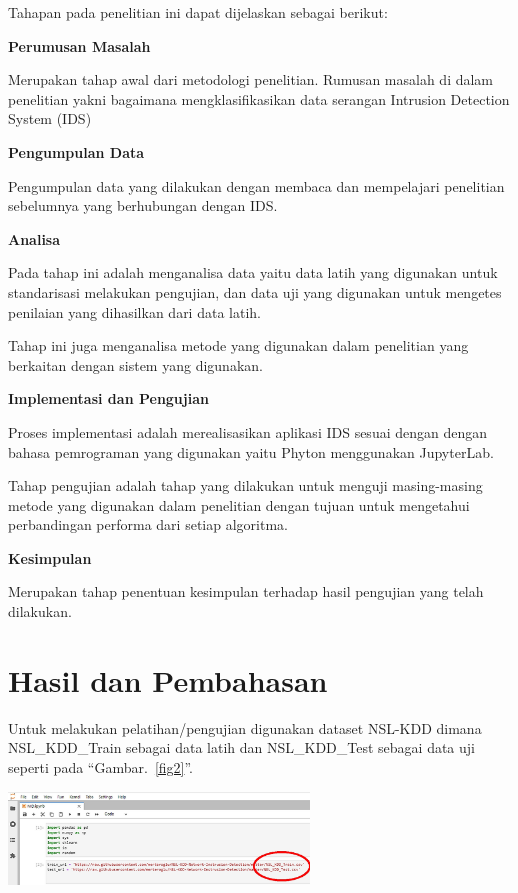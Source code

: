 \documentclass[conference]{IEEEtran}
\begin{document}
Tahapan pada penelitian ini dapat dijelaskan sebagai berikut:

\noindent \textbf{Perumusan Masalah}

Merupakan tahap awal dari metodologi penelitian. Rumusan
masalah di dalam penelitian yakni bagaimana mengklasifikasikan data serangan Intrusion Detection System (IDS)

\noindent \textbf{Pengumpulan Data}

Pengumpulan data yang dilakukan dengan membaca dan mempelajari penelitian sebelumnya yang berhubungan dengan IDS.

\noindent \textbf{Analisa}

Pada tahap ini adalah menganalisa data yaitu data latih yang digunakan untuk standarisasi melakukan pengujian, dan data uji yang digunakan untuk mengetes penilaian yang dihasilkan
dari data latih.

Tahap ini juga menganalisa metode yang digunakan dalam penelitian yang berkaitan dengan sistem yang digunakan.

\noindent \textbf{Implementasi dan Pengujian}

Proses implementasi adalah merealisasikan aplikasi IDS sesuai dengan dengan bahasa pemrograman yang digunakan yaitu Phyton menggunakan JupyterLab.

Tahap pengujian adalah tahap yang dilakukan untuk menguji masing-masing metode yang digunakan dalam penelitian dengan tujuan untuk mengetahui perbandingan performa dari setiap algoritma.

\noindent \textbf{Kesimpulan}

Merupakan tahap penentuan kesimpulan terhadap hasil pengujian yang telah dilakukan.

\section{Hasil dan Pembahasan}

Untuk melakukan pelatihan/pengujian digunakan dataset NSL-KDD dimana NSL\_KDD\_Train sebagai data latih dan NSL\_KDD\_Test sebagai data uji seperti pada ``Gambar.~\ref{fig2}''.\\

\begin{minipage}{\linewidth}
\centerline{\includegraphics[width=80mm]{Gambar/Gbr01.jpg}}
\label{fig2}
\end{minipage}
\end{document}
